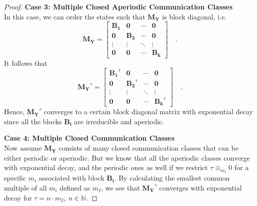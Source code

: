 \documentclass[../../main.tex]{subfiles}
\begin{document}
\begin{proof}
        \textbf{Case 3: Multiple Closed Aperiodic Communication Classes} \\
        In this case, we can order the states such that $\bm{M_Y}$ is block diagonal, i.e.
        \[
            \bm{M_Y} = 
            \begin{bmatrix}
            \bm{B_1} & \bm{0} & \cdots & \bm{0} \\
            \bm{0} & \bm{B_2} & \cdots & \bm{0} \\
            \vdots & \vdots & \ddots & \vdots \\
            \bm{0} & \bm{0} & \cdots & \bm{B_k}
            \end{bmatrix}
            \quad .
        \]
        It follows that
        \[
            \bm{M_Y}^\tau = 
            \begin{bmatrix}
            \bm{B_1}^\tau & \bm{0} & \cdots & \bm{0} \\
            \bm{0} & \bm{B_2}^\tau & \cdots & \bm{0} \\
            \vdots & \vdots & \ddots & \vdots \\
            \bm{0} & \bm{0} & \cdots & \bm{B_k}^\tau
            \end{bmatrix}
            \quad .
        \]
        Hence, $\bm{M_Y}^\tau$ converges to a certain block diagonal matrix with exponential decay since all the blocks $\bm{B_i}$ are irreducible and aperiodic.

        \textbf{Case 4: Multiple Closed Communication Classes} \\
        Now assume $\bm{M_Y}$ consists of many closed communication classes that can be either periodic or aperiodic. But we know that all the aperiodic classes converge with exponential decay, and the periodic ones as well if we restrict $\tau \equiv_{m_i} 0$ for a specific $m_i$ associated with block $\bm{B_i}$. By calculating the smallest common multiple of all $m_i$ defined as $m_I$, we see that $\bm{M_Y}^\tau$ converges with exponential decay for $\tau = n \cdot m_I, \ n \in \mathbb{N}$.


\end{proof}
\end{document}
